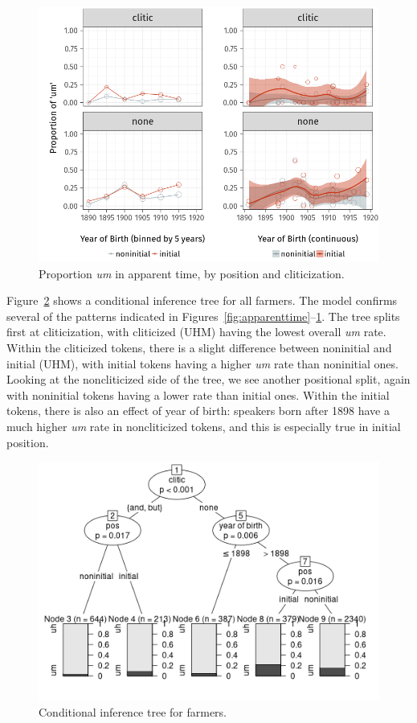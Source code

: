\documentclass[11pt]{article}
\begin{document}
\begin{figure}[htpb]
    \centering
    \includegraphics[width=0.8\linewidth]{figures/apparentclitic.png}
    \caption{Proportion \emph{um} in apparent time, by position and
    cliticization.}
    \label{fig:apparentclitic}
\end{figure}

Figure~\ref{fig:farmertree} shows a conditional inference tree for all farmers.
The model confirms several of the patterns indicated in
Figures~\ref{fig:apparenttime}--\ref{fig:apparentclitic}.
The tree splits first at cliticization, with cliticized (UHM) having the lowest
overall \emph{um} rate.
Within the cliticized tokens, there is a slight difference between noninitial
and initial (UHM), with initial tokens having a higher \emph{um} rate than
noninitial ones.
Looking at the noncliticized side of the tree, we see another positional split,
again with noninitial tokens having a lower rate than initial ones.
Within the initial tokens, there is also an effect of year of birth:
speakers born after 1898 have a much higher \emph{um} rate in noncliticized
tokens, and this is especially true in initial position.

\begin{figure}[htpb]
    \centering
    \includegraphics[width=0.8\linewidth]{figures/ctreefarmers.png}
    \caption{Conditional inference tree for farmers.}
    \label{fig:farmertree}
\end{figure}
\end{document}
